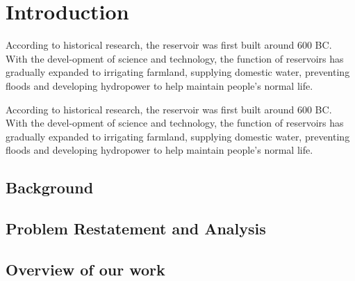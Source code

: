 \section{Introduction}  %

\indent According to historical research, the reservoir was first built around 600 BC. With the devel-opment of science and technology, the function of reservoirs has gradually expanded to irrigating farmland, supplying domestic water, preventing floods and developing hydropower to help maintain people’s normal life.

According to historical research, the reservoir was first built around 600 BC. With the devel-opment of science and technology, the function of reservoirs has gradually expanded to irrigating farmland, supplying domestic water, preventing floods and developing hydropower to help maintain people’s normal life.

\subsection{Background}
\subsection{Problem Restatement and Analysis}
\subsection{Overview of our work}
